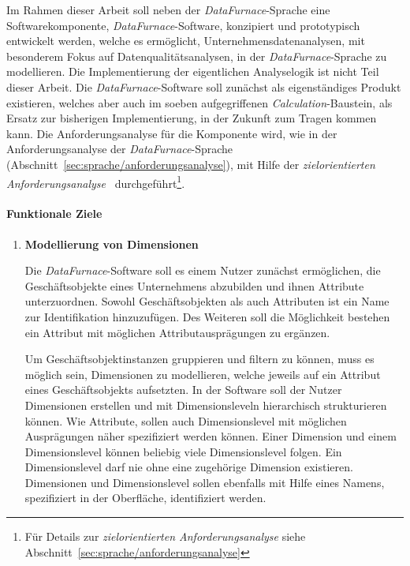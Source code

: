 \documentclass[
  language=german, %
  type=bachelor%
]{isthesis}
\begin{document}
\begin{content}
	Im Rahmen dieser Arbeit soll neben der \textit{DataFurnace}-Sprache eine
	Softwarekomponente, \textit{DataFurnace}-Software, konzipiert und
	prototypisch entwickelt werden, welche es ermöglicht,
	Unternehmensdatenanalysen, mit besonderem Fokus auf Datenqualitätsanalysen,
	in der \textit{DataFurnace}-Sprache zu modellieren. Die Implementierung der
	eigentlichen Analyselogik ist nicht Teil dieser Arbeit.  Die
	\textit{DataFurnace}-Software soll zunächst als eigenständiges Produkt
	existieren, welches aber auch im soeben aufgegriffenen
	\textit{Calculation}-Baustein, als Ersatz zur bisherigen Implementierung, in
	der Zukunft zum Tragen kommen kann. Die Anforderungsanalyse für die
	Komponente wird, wie in der Anforderungsanalyse der
	\textit{DataFurnace}-Sprache
	(Abschnitt~\ref{sec:sprache/anforderungsanalyse}), mit Hilfe der
	\textit{zielorientierten Anforderungsanalyse}~\cite[][]{van2001goal}
	durchgeführt\footnote{Für Details zur \textit{zielorientierten
	Anforderungsanalyse} siehe Abschnitt~\ref{sec:sprache/anforderungsanalyse}}. 


  \paragraph{Funktionale Ziele}
  \begin{enumerate}
    \item \textbf{Modellierung von Dimensionen}

      Die \textit{DataFurnace}-Software soll es einem Nutzer zunächst
      ermöglichen, die Geschäftsobjekte eines Unternehmens abzubilden und ihnen
      Attribute unterzuordnen. Sowohl Geschäftsobjekten als auch Attributen
      ist ein Name zur Identifikation hinzuzufügen. Des Weiteren soll die
      Möglichkeit bestehen ein Attribut mit möglichen Attributausprägungen zu
      ergänzen.

      Um Geschäftsobjektinstanzen gruppieren und filtern zu können, muss es
      möglich sein, Dimensionen zu modellieren, welche jeweils auf ein Attribut
      eines Geschäftsobjekts aufsetzten. In der Software soll der Nutzer
      Dimensionen erstellen und mit Dimensionsleveln hierarchisch strukturieren
      können. Wie Attribute, sollen auch Dimensionslevel mit möglichen
      Ausprägungen näher spezifiziert werden können. Einer Dimension und einem
      Dimensionslevel können beliebig viele Dimensionslevel folgen. Ein
      Dimensionslevel darf nie ohne eine zugehörige Dimension existieren.
      Dimensionen und Dimensionslevel sollen ebenfalls mit Hilfe eines Namens,
      spezifiziert in der Oberfläche, identifiziert werden.


\end{enumerate}
\end{content}
\end{document}
